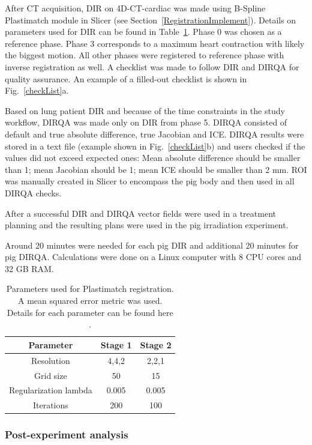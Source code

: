 \documentclass[type=dr, dr=rernat, accentcolor=tud7b,colorbacktitle, bigchapter, openright, twoside, 12pt ]{tudthesis}
\begin{document}
After CT acquisition, DIR on 4D-CT-cardiac was made using B-Spline Plastimatch module in Slicer (see Section~\ref{RegistrationImplement}). 
Details on parameters used for DIR can be found in Table~\ref{tab:stages2}. Phase 0 was chosen as a reference phase. Phase 3 corresponds to a maximum heart contraction with likely
the biggest motion. All other phases were registered to reference phase with inverse registration as well. 
A checklist was made to follow DIR and DIRQA for quality assurance. An example of a filled-out checklist is shown in Fig.~\ref{checkList}a.

Based on lung patient DIR and because of the time constraints in the study workflow, DIRQA was made only on DIR from phase 5. 
DIRQA consisted of default and true absolute difference, true Jacobian and ICE. DIRQA results were stored in a text file (example shown in Fig.~\ref{checkList}b) and users checked if the values did not exceed expected ones: Mean absolute difference
should be smaller than 1; mean Jacobian  should be 1; mean ICE  should be smaller than 2 mm. ROI was manually created in Slicer to encompass the pig body and then used in all DIRQA checks.

After a successful DIR and DIRQA vector fields were used in a treatment planning and the resulting plans were used in the pig irradiation experiment.

Around 20 minutes were needed for each pig DIR and additional 20 minutes for pig DIRQA. Calculations were done on a Linux computer with 8 CPU cores and 32 GB RAM.

\begin{table}[H]
  \centering
  \caption{Parameters used for Plastimatch registration.  A mean squared error metric was used. Details for each parameter can be found here \cite{Plastimatch}.}
  \begin{tabular}{c|c|c}
      Parameter & Stage 1 & Stage 2 \\
      \hline
      Resolution & 4,4,2 & 2,2,1 \\
      Grid size & 50 & 15 \\
      Regularization lambda & 0.005 & 0.005 \\
      Iterations & 200 & 100 \\
    \hline\hline
  \end{tabular}
  \label{tab:stages2}
\end{table}

\subsubsection{Post-experiment analysis}
\end{document}

